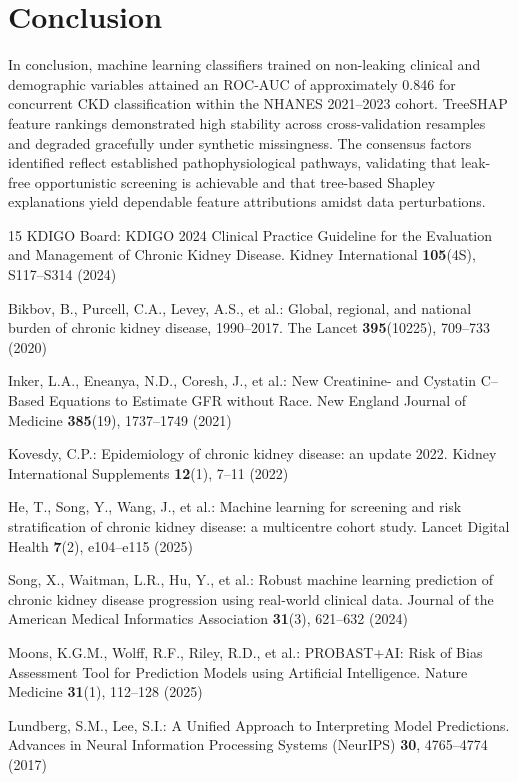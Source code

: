 \documentclass[runningheads]{llncs}
\begin{document}
\section{Conclusion}
In conclusion, machine learning classifiers trained on non-leaking clinical and demographic variables attained an ROC-AUC of approximately 0.846 for concurrent CKD classification within the NHANES 2021–2023 cohort. TreeSHAP feature rankings demonstrated high stability across cross-validation resamples and degraded gracefully under synthetic missingness. The consensus factors identified reflect established pathophysiological pathways, validating that leak-free opportunistic screening is achievable and that tree-based Shapley explanations yield dependable feature attributions amidst data perturbations.

\begin{thebibliography}{15}
 KDIGO Board: KDIGO 2024 Clinical Practice Guideline for the Evaluation and Management of Chronic Kidney Disease. Kidney International \textbf{105}(4S), S117--S314 (2024)

 Bikbov, B., Purcell, C.A., Levey, A.S., et al.: Global, regional, and national burden of chronic kidney disease, 1990--2017. The Lancet \textbf{395}(10225), 709--733 (2020)

 Inker, L.A., Eneanya, N.D., Coresh, J., et al.: New Creatinine- and Cystatin C--Based Equations to Estimate GFR without Race. New England Journal of Medicine \textbf{385}(19), 1737--1749 (2021)

 Kovesdy, C.P.: Epidemiology of chronic kidney disease: an update 2022. Kidney International Supplements \textbf{12}(1), 7--11 (2022)

 He, T., Song, Y., Wang, J., et al.: Machine learning for screening and risk stratification of chronic kidney disease: a multicentre cohort study. Lancet Digital Health \textbf{7}(2), e104--e115 (2025)

 Song, X., Waitman, L.R., Hu, Y., et al.: Robust machine learning prediction of chronic kidney disease progression using real-world clinical data. Journal of the American Medical Informatics Association \textbf{31}(3), 621--632 (2024)

 Moons, K.G.M., Wolff, R.F., Riley, R.D., et al.: PROBAST+AI: Risk of Bias Assessment Tool for Prediction Models using Artificial Intelligence. Nature Medicine \textbf{31}(1), 112--128 (2025)

 Lundberg, S.M., Lee, S.I.: A Unified Approach to Interpreting Model Predictions. Advances in Neural Information Processing Systems (NeurIPS) \textbf{30}, 4765--4774 (2017)


\end{thebibliography}
\end{document}
